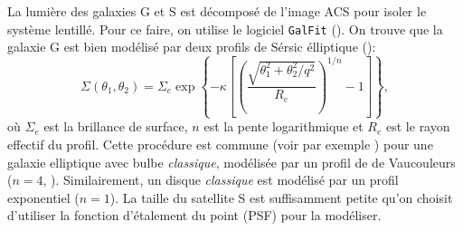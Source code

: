 \documentclass[times,10pt,twocolumn]{article}
\begin{document}
La lumière des galaxies G et S est décomposé de l'image ACS pour 
isoler le système lentillé. Pour ce faire, on utilise le 
logiciel \texttt{GalFit} (\citet{Peng2002,Peng2010}). On trouve que la 
galaxie G est bien modélisé par deux profils de Sérsic élliptique (\citet{Sersic1968}):
\begin{equation}\label{eq:} 
        \Sigma(\theta_1, \theta_2) = \Sigma_e \exp \left\{ -\kappa 
\left[  
                \left( 
                        \frac{\sqrt{\theta_1^2 + \theta_2^2/q^2}}{R_e}
         \right)^{1/n} 
         -1
\right]
 \right\},
\end{equation} 
où $\Sigma_e$ est la brillance de surface, $n$ est la pente logarithmique et 
$R_e$ est le rayon effectif du profil.
Cette procédure est commune 
(voir par exemple \citet{Suyu2013})
pour une galaxie elliptique 
avec bulbe \textit{classique}, modélisée par 
un profil de de Vaucouleurs ($n=4$, \citet{DeVaucouleurs1948}).
Similairement, un disque \textit{classique} est modélisé par 
un profil exponentiel ($n=1$). La taille du satellite S est suffisamment petite 
qu'on choisit d'utiliser la fonction d'étalement du point (PSF) pour la 
modéliser.
\end{document}
